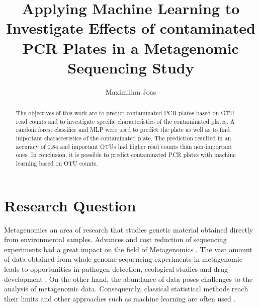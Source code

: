\documentclass{svproc}
\begin{document}
\mainmatter              %
%
\title{Applying Machine Learning to Investigate Effects of contaminated PCR Plates in a Metagenomic Sequencing Study}
%
%
\author{Maximilian Joas }
%
%
%
%
\maketitle              %
%
\begin{abstract}
 The objectives of this work are to predict contaminated PCR plates based on OTU read counts and to investigate specific characteristics of the contaminated plates. A random forest classifier and MLP were used to predict the plate as well as to find important characteristics of the contaminated plate. The prediction resulted in an accuracy of 0.84 and important OTUs had higher read counts than non-important ones. In conclusion, it is possible to predict contaminated PCR plates with machine learning based on OTU counts.
\end{abstract}
%
%
\section{Research Question}
%
Metagenomics an area of research that studies genetic material obtained directly from environmental samples.
Advances and cost reduction of sequencing experiments had a great impact on the field of Metagenomics \cite{junemann2017bioinformatics}.
The vast amount of data obtained from whole-genome sequencing experiments in metagenomic leads to opportunities in pathogen detection, ecological studies and drug development \cite{chiu2019clinical}\cite{junemann2017bioinformatics}. On the other hand, the abundance of data poses challenges to the analysis of metagenomic data. Consequently, classical statistical methods reach their limits and other approaches such as machine learning are often used \cite{Soueidan2017}.\\
\end{document}
